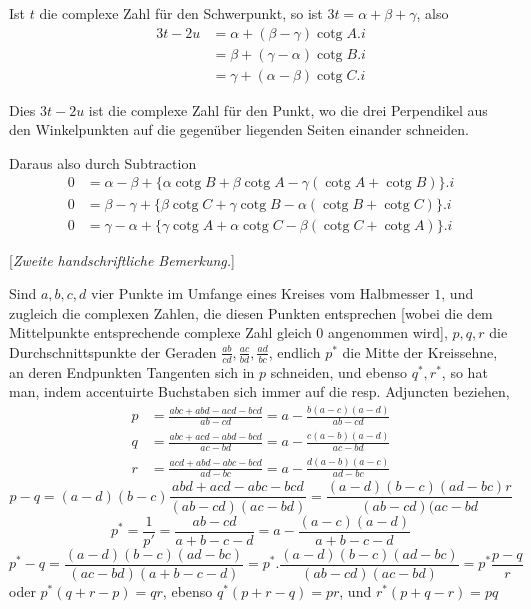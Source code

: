 %
\par
Ist \(t\) die complexe Zahl für den Schwerpunkt, so ist \(3t=\alpha+\beta+\gamma\), also
\[
\begin{aligned}
3t-2u&=\alpha+(\beta-\gamma)\operatorname{cotg}A.i\\
&=\beta+(\gamma-\alpha)\operatorname{cotg}B.i\\
&=\gamma+(\alpha-\beta)\operatorname{cotg}C.i
\end{aligned}
\]
\par
Dies \(3t-2u\) ist die complexe Zahl für den Punkt, wo die drei Perpendikel aus den Winkelpunkten auf die gegenüber liegenden Seiten einander schneiden.

Daraus also durch Subtraction
\[
\begin{aligned}
0&=\alpha-\beta+\{\alpha\operatorname{cotg}B+\beta\operatorname{cotg}A-\gamma(\operatorname{cotg}A+\operatorname{cotg}B)\}.i\\
0&=\beta-\gamma+\{\beta\operatorname{cotg}C+\gamma\operatorname{cotg}B-\alpha(\operatorname{cotg}B+\operatorname{cotg}C)\}.i\\
0&=\gamma-\alpha+\{\gamma\operatorname{cotg}A+\alpha\operatorname{cotg}C-\beta(\operatorname{cotg}C+\operatorname{cotg}A)\}.i
\end{aligned}
\]
\par\medskip{}
\begin{center}[\textit{Zweite handschriftliche Bemerkung.}]\end{center}
\hspace*{\parindent}Sind \(a,b,c,d\) vier Punkte im Umfange eines Kreises vom Halbmesser \(1\), und zugleich die complexen Zahlen, die diesen Punkten entsprechen [wobei die dem Mittelpunkte entsprechende complexe Zahl gleich \(0\) angenommen wird], \(p,q,r\) die Durchschnittspunkte der Geraden \(\tfrac{ab}{cd},\tfrac{ac}{bd},\tfrac{ad}{bc}\), endlich \(p^*\) die Mitte der Kreissehne, an deren Endpunkten Tangenten sich in \(p\) schneiden, und ebenso \(q^*,r^*\), so hat man, indem accentuirte Buchstaben sich immer auf die resp. Adjuncten beziehen,
\[
\begin{aligned}
p&=\frac{abc+abd-acd-bcd}{ab-cd}=a-\frac{b(a-c)(a-d)}{ab-cd}\\
q&=\frac{abc+acd-abd-bcd}{ac-bd}=a-\frac{c(a-b)(a-d)}{ac-bd}\\
r&=\frac{acd+abd-abc-bcd}{ad-bc}=a-\frac{d(a-b)(a-c)}{ad-bc}
\end{aligned}
\]
\[
p-q=(a-d)(b-c)\frac{abd+acd-abc-bcd}{(ab-cd)(ac-bd)}=\frac{(a-d)(b-c)(ad-bc)r}{(ab-cd)(ac-bd}
\]
\[
p^*=\frac1{p'}=\frac{ab-cd}{a+b-c-d}=a-\frac{(a-c)(a-d)}{a+b-c-d}
\]
\[
p^*-q=\frac{(a-d)(b-c)(ad-bc)}{(ac-bd)(a+b-c-d)}=p^*.\frac{(a-d)(b-c)(ad-bc)}{(ab-cd)(ac-bd)}=p^*\frac{p-q}{r}
\]
oder \(p^*(q+r-p)=qr\), ebenso \(q^*(p+r-q)=pr\), und \(r^*(p+q-r)=pq\)
